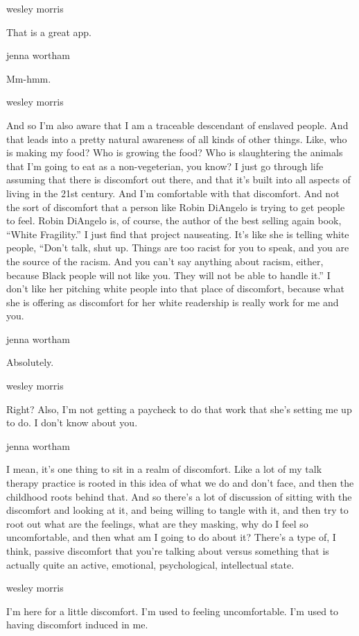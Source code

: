 wesley morris

That is a great app.

jenna wortham

Mm-hmm.

wesley morris

And so I'm also aware that I am a traceable descendant of enslaved
people. And that leads into a pretty natural awareness of all kinds of
other things. Like, who is making my food? Who is growing the food? Who
is slaughtering the animals that I'm going to eat as a non-vegeterian,
you know? I just go through life assuming that there is discomfort out
there, and that it's built into all aspects of living in the 21st
century. And I'm comfortable with that discomfort. And not the sort of
discomfort that a person like Robin DiAngelo is trying to get people to
feel. Robin DiAngelo is, of course, the author of the best selling again
book, ``White Fragility.'' I just find that project nauseating. It's
like she is telling white people, ``Don't talk, shut up. Things are too
racist for you to speak, and you are the source of the racism. And you
can't say anything about racism, either, because Black people will not
like you. They will not be able to handle it.'' I don't like her
pitching white people into that place of discomfort, because what she is
offering as discomfort for her white readership is really work for me
and you.

jenna wortham

Absolutely.

wesley morris

Right? Also, I'm not getting a paycheck to do that work that she's
setting me up to do. I don't know about you.

jenna wortham

I mean, it's one thing to sit in a realm of discomfort. Like a lot of my
talk therapy practice is rooted in this idea of what we do and don't
face, and then the childhood roots behind that. And so there's a lot of
discussion of sitting with the discomfort and looking at it, and being
willing to tangle with it, and then try to root out what are the
feelings, what are they masking, why do I feel so uncomfortable, and
then what am I going to do about it? There's a type of, I think, passive
discomfort that you're talking about versus something that is actually
quite an active, emotional, psychological, intellectual state.

wesley morris

I'm here for a little discomfort. I'm used to feeling uncomfortable. I'm
used to having discomfort induced in me.

